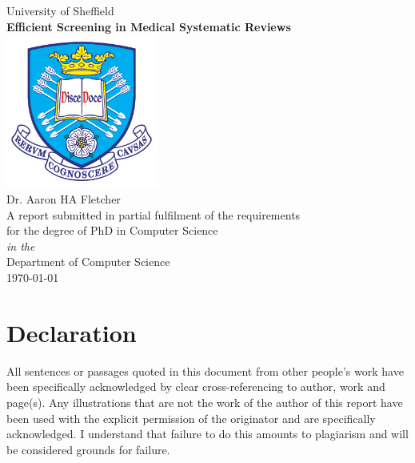 \documentclass[10pt,oneside]{book}
\begin{document}

\begin{titlepage}



\begin{center}
{\LARGE University of Sheffield}\\[1.5cm]
\linespread{1.2}\huge {\bfseries Efficient Screening in Medical Systematic Reviews}\\[1.5cm]
\linespread{1}
\includegraphics[width=5cm]{images/tuoslogo.png}\\[1cm]
{\Large Dr. Aaron HA Fletcher}\\[1cm]
\large A report submitted in partial fulfilment of the requirements\\ for the degree of PhD in Computer Science\\[0.3cm] 
\textit{in the}\\[0.3cm]
Department of Computer Science\\[2cm]
\today
\end{center}

\end{titlepage}


\newpage
\section*{\Large Declaration}

All sentences or passages quoted in this document from other people's work have been specifically acknowledged by clear cross-referencing to author, work and page(s).  Any illustrations that are not the work of the author of this report have been used with the explicit permission of the originator and are specifically acknowledged.  I understand that failure to do this amounts to plagiarism and will be considered grounds for failure.\\[1cm]
\end{document}
